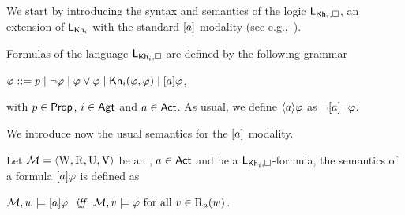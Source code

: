 We start by introducing the syntax and semantics of the logic $\mathsf{L}_{{\sf Kh}_i,\square}$,  an extension of $\mathsf{L}_{{\sf Kh}_i}$ with the standard $[a]$ modality (see e.g.,~\cite{HML,mlbook}).

\medskip

\begin{definition}\label{def:khimlsyntax}
Formulas of the language $\mathsf{L}_{{\sf Kh}_i,\square}$ are defined by the following grammar
\begin{spcenter}
$\varphi ::= p \mid \neg\varphi \mid \varphi\vee\varphi \mid {\sf Kh}_i(\varphi,\varphi) \mid [a]\varphi$,
\end{spcenter}
with $p \in {\rm \sf Prop}$, $i \in {\rm \sf Agt}$ and $a \in {\rm \sf Act}$.
As usual, we define $\langle a \rangle\varphi$ as $\neg[a]\neg\varphi$. %
\end{definition}

\medskip

We introduce now the usual semantics for the $[a]$ modality.

\medskip

\begin{definition}\label{def:khimlsemantics}
Let $\mathcal{M} = \langle \operatorname{W}, \operatorname{R}, \operatorname{U}, \operatorname{V} \rangle$ be an \ults, $a \in {\rm \sf Act}$ and  be a $\mathsf{L}_{{\sf Kh}_i,\square}$-formula, the semantics of a formula $[a]\varphi$ is defined as
\begin{spcenter}
$\modults,w \models \mlbox{a}\varphi \ \ \iff \ \ \modults,v \models \varphi \mbox{ for all }v \in \R_a(w)$.
\end{spcenter}
\end{definition}

